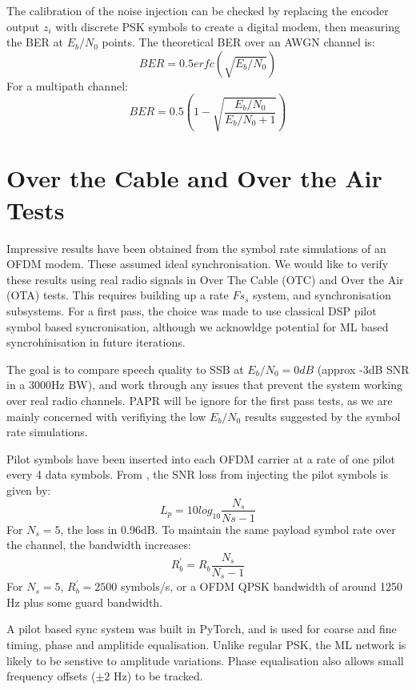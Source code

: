 \documentclass{article}
\begin{document}
The calibration of the noise injection can be checked by replacing the encoder output $z_i$ with discrete PSK symbols to create a digital modem, then measuring the BER at $E_b/N_0$ points. The theoretical BER over an AWGN channel is:
\begin{equation}
\label{eq:ber_awgn}
BER = 0.5erfc(\sqrt{E_b/N_0})
\end{equation}
For a multipath channel:
\begin{equation}
\label{eq:ber_multipath}
BER = 0.5 \left(1-\sqrt{\frac{E_b/N_0}{E_b/N_0+1}} \right)
\end{equation}


\section{Over the Cable and Over the Air Tests}

Impressive results have been obtained from the symbol rate simulations of an OFDM modem.  These assumed ideal synchronisation.  We would like to verify these results using real radio signals in Over The Cable (OTC) and Over the Air (OTA) tests.  This requires building up a rate $Fs_s$ system, and synchronisation subsystems.  For a first pass, the choice was made to use classical DSP pilot symbol based syncronisation, although we acknowldge potential for ML based syncrohinisation in future iterations.

The goal is to compare speech quality to SSB at $E_b/N_0=0dB$ (approx -3dB SNR in a 3000Hz BW), and work through any issues that prevent the system working over real radio channels.  PAPR will be ignore for the first pass tests, as we are mainly concerned with verifiying the low $E_b/N_0$ results suggested by the symbol rate simulations.

Pilot symbols have been inserted into each OFDM carrier at a rate of one pilot every 4 data symbols.  From \cite{freedv_low}, the SNR loss from injecting the pilot symbols is given by:
\begin{equation}
L_p = 10log_{10}\frac{N_s}{Ns-1}
\end{equation}
For $N_s=5$, the loss in 0.96dB.  To maintain the same payload symbol rate over the channel, the bandwidth increases:
\begin{equation}
R^\prime_b = R_b\frac{N_s}{N_s-1}
\end{equation}
For $N_s=5$, $R^\prime_b=2500$ symbols/s, or a OFDM QPSK bandwidth of around 1250 Hz plus some guard bandwidth.

A pilot based sync system was built in PyTorch, and is used for coarse and fine timing, phase and amplitide equalisation.  Unlike regular PSK, the ML network is likely to be senstive to amplitude variations.  Phase equalisation also allows small frequency offsets ($\pm2$ Hz) to be tracked.
\end{document}
